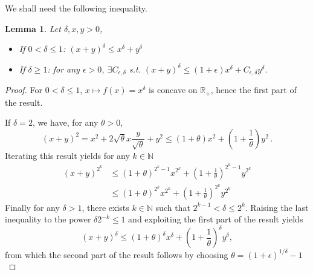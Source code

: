 \documentclass[notitlepage,reqno,11pt]{amsart}
\numberwithin{equation}{section}
\newtheorem{lemma}{Lemma}[section]
\begin{document}
We shall need the following inequality.
\begin{lemma}
\label{rapp}
Let $\delta, x,y>0$, 
\begin{itemize}
\item If $0<\delta \leq 1$: $(x+y)^\delta \leq x^\delta+y^ \delta$
\item If $\delta \geq 1$: for any $\epsilon>0$, $\exists C_{\epsilon,\delta}$ s.t.  $(x+y)^\delta \leq (1+\epsilon) x^{\delta }+ C_{\epsilon, \delta}y^{\delta}$.
\end{itemize}
\end{lemma}
\begin{proof}
For $0<\delta\le1$, $ x \mapsto f(x)=x^\delta$ is concave on $\mathbb{R}_+$, hence the first part of the result.

If $\delta=2$, we have, for any $\theta>0$,
\[(x+y)^2= x^2+ 2 \sqrt{\theta}x  \frac{y}{\sqrt{\theta}} +y^2\leq (1+ \theta )x^2   +\left(1+\frac{1}{\theta}\right)y^2\,.\]
Iterating this result yields for any $k\in\mathbb{N}$
 \begin{align*}
  (x+y)^{2^k}&\leq (1+\theta )^{2^k-1} x^{2^k}+\left(1+\frac{1}{\theta}\right)^{2^k-1} y^{2^k}\\
  &\le (1+\theta )^{2^k} x^{2^k}+\left(1+\frac{1}{\theta}\right)^{2^k} y^{2^k}
  \end{align*}
  Finally for any $\delta>1$, there exists $k\in\mathbb{N}$ such that $2^{k-1}< \delta \leq 2^k$. Raising the last inequality to the power 
  $\delta 2^{-k}\le1$ and exploiting the first part of the result yields 
  \[(x+y)^\delta\le(1+\theta )^{\delta} x^{\delta}+\left(1+\frac{1}{\theta}\right)^{\delta} y^{\delta},\]
  from which the second part of the result follows by choosing $\theta=(1+\epsilon)^{1/\delta}-1$

\end{proof}
\end{document}
